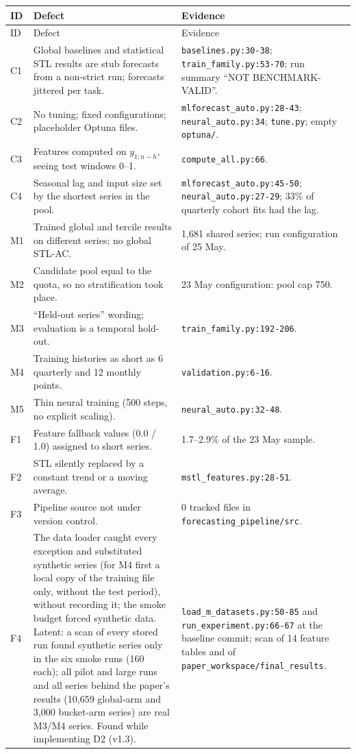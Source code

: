 \documentclass[11pt,a4paper]{article}
\newcommand{\code}[1]{\texttt{#1}}
\begin{document}
{\small
\begin{longtable}{@{}p{0.8cm} p{8.8cm} p{5.6cm}@{}}
\toprule
ID & Defect & Evidence \\
\midrule
\endfirsthead
\toprule
ID & Defect & Evidence \\
\midrule
\endhead
\bottomrule
\endfoot
C1 & Global baselines and statistical STL results are stub forecasts from a non-strict run; forecasts jittered per task. & \code{baselines.py:30-38}; \code{train_family.py:53-70}; run summary ``NOT BENCHMARK-VALID''. \\
C2 & No tuning; fixed configurations; placeholder Optuna files. & \code{mlforecast_auto.py:28-43}; \code{neural_auto.py:34}; \code{tune.py}; empty \code{optuna/}. \\
C3 & Features computed on $y_{1:n-h}$, seeing test windows 0--1. & \code{compute_all.py:66}. \\
C4 & Seasonal lag and input size set by the shortest series in the pool. & \code{mlforecast_auto.py:45-50}; \code{neural_auto.py:27-29}; 33\% of quarterly cohort fits had the lag. \\
M1 & Trained global and tercile results on different series; no global STL-AC. & 1,681 shared series; run configuration of 25 May. \\
M2 & Candidate pool equal to the quota, so no stratification took place. & 23 May configuration: pool cap 750. \\
M3 & ``Held-out series'' wording; evaluation is a temporal hold-out. & \code{train_family.py:192-206}. \\
M4 & Training histories as short as 6 quarterly and 12 monthly points. & \code{validation.py:6-16}. \\
M5 & Thin neural training (500 steps, no explicit scaling). & \code{neural_auto.py:32-48}. \\
F1 & Feature fallback values (0.0 / 1.0) assigned to short series. & 1.7--2.9\% of the 23 May sample. \\
F2 & STL silently replaced by a constant trend or a moving average. & \code{mstl_features.py:28-51}. \\
F3 & Pipeline source not under version control. & 0 tracked files in \code{forecasting_pipeline/src}. \\
F4 & The data loader caught every exception and substituted synthetic series (for M4 first a local copy of the training file only, without the test period), without recording it; the smoke budget forced synthetic data. Latent: a scan of every stored run found synthetic series only in the six smoke runs (160 each); all pilot and large runs and all series behind the paper's results (10,659 global-arm and 3,000 bucket-arm series) are real M3/M4 series. Found while implementing D2 (v1.3). & \code{load_m_datasets.py:50-85} and \code{run_experiment.py:66-67} at the baseline commit; scan of 14 feature tables and of \code{paper_workspace/final_results}. \\

\end{longtable}}
\end{document}
